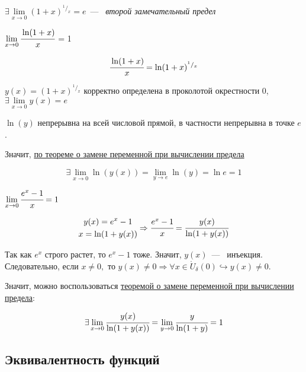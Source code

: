 \begin{corollary}
    $\exists \lim\limits_{x \to 0} \left( 1 + x \right)^{^1/_x} = e$~---~ \textit{второй замечательный предел}
\end{corollary}

\begin{example}
    $\lim\limits_{x\to 0 } \cfrac{\ln(1 + x)}{x}$ = 1

    $$ \cfrac{\ln (1+x)}{x} = \ln (1 + x)^{^1/_x}$$

    $y (x) = (1 + x)^{^1/_x} $ корректно определена в проколотой окрестности 0, $ \exists \lim\limits_{x \to 0} y(x) = e$

    $\ln(y)$ непрерывна на всей числовой прямой, в частности непрерывна в точке $e$. 
    
    Значит, \hyperlink{thrm4.18}{по теореме о замене переменной при вычислении предела} 
    
    $$\exists \lim\limits_{x \to 0} \ln(y(x)) = \lim\limits_{y \to e} \ln (y) = \ln e = 1$$
\end{example}

\begin{example}
    $ \lim\limits_{x \to 0} \cfrac{e^{x} - 1}{x} = 1$

    $$ 
    \begin{gathered}
        y(x) = e^{x} - 1
    \\
        x = \ln(1 + y(x))  
    \end{gathered}
    \Rightarrow 
    \cfrac{e^{x} - 1}{x} = \cfrac{y(x)}{\ln(1 + y(x))}
    $$

    Так как $e^{x}$ строго растет, то $e^{x} - 1$ тоже. Значит, $y(x)$~---~ инъекция. Следовательно, если $x \neq 0,$ то  $y(x) \neq 0 \Rightarrow \forall x \in \mathring{U}_{\delta}(0) \hookrightarrow y(x) \neq 0$. 
    
    Значит, можно воспользоваться \hyperlink{thrm4.17}{теоремой о замене переменной при вычислении предела}:

    $$
    \exists \lim\limits_{x \to 0} \cfrac{y(x)}{\ln(1 + y(x))} = \lim\limits_{y \to 0} \cfrac{y}{\ln (1+y)} = 1
    $$
\end{example}

\subsection{Эквивалентность функций}

